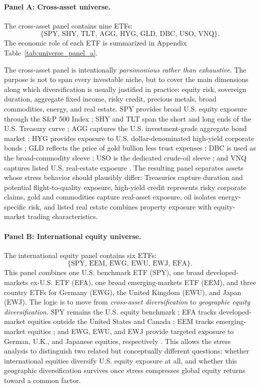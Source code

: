 \paragraph{Panel A: Cross-asset universe.}
The cross-asset panel contains nine ETFs:
\[
\{\text{SPY, SHY, TLT, AGG, HYG, GLD, DBC, USO, VNQ}\}.
\]
The economic role of each ETF is summarized in Appendix Table~\ref{tab:universe_panel_a}.

The cross-asset panel is intentionally \emph{parsimonious rather than exhaustive}. The purpose is not to span every investable niche, but to cover the main dimensions along which diversification is usually justified in practice: equity risk, sovereign duration, aggregate fixed income, risky credit, precious metals, broad commodities, energy, and real estate. SPY provides broad U.S. equity exposure through the S\&P 500 Index \citep{ssga_spy_2026}; SHY and TLT span the short and long ends of the U.S. Treasury curve \citep{ishares_shy_2026,ishares_tlt_2026}; AGG captures the U.S. investment-grade aggregate bond market \citep{ishares_agg_2026}; HYG provides exposure to U.S. dollar-denominated high-yield corporate bonds \citep{ishares_hyg_2026}; GLD reflects the price of gold bullion less trust expenses \citep{ssga_gld_2026}; DBC is used as the broad-commodity sleeve \citep{invesco_dbc_2026}; USO is the dedicated crude-oil sleeve \citep{uscf_uso_2026}; and VNQ captures listed U.S. real-estate exposure \citep{vanguard_vnq_2026}. The resulting panel separates assets whose stress behavior should plausibly differ: Treasuries capture duration and potential flight-to-quality exposure, high-yield credit represents risky corporate claims, gold and commodities capture real-asset exposure, oil isolates energy-specific risk, and listed real estate combines property exposure with equity-market trading characteristics.

\paragraph{Panel B: International equity universe.}
The international equity panel contains six ETFs:
\[
\{\text{SPY, EEM, EWG, EWU, EWJ, EFA}\}.
\]
This panel combines one U.S. benchmark ETF (SPY), one broad developed-markets ex-U.S. ETF (EFA), one broad emerging-markets ETF (EEM), and three country ETFs for Germany (EWG), the United Kingdom (EWU), and Japan (EWJ). The logic is to move from \emph{cross-asset diversification} to \emph{geographic equity diversification}. SPY remains the U.S. equity benchmark \citep{ssga_spy_2026}; EFA tracks developed-market equities outside the United States and Canada \citep{ishares_efa_2026}; EEM tracks emerging-market equities \citep{ishares_eem_2026}; and EWG, EWU, and EWJ provide targeted exposure to German, U.K., and Japanese equities, respectively \citep{ishares_ewg_2026,ishares_ewu_2026,ishares_ewj_2026}. This allows the stress analysis to distinguish two related but conceptually different questions: whether international equities diversify U.S. equity exposure at all, and whether this geographic diversification survives once stress compresses global equity returns toward a common factor.


